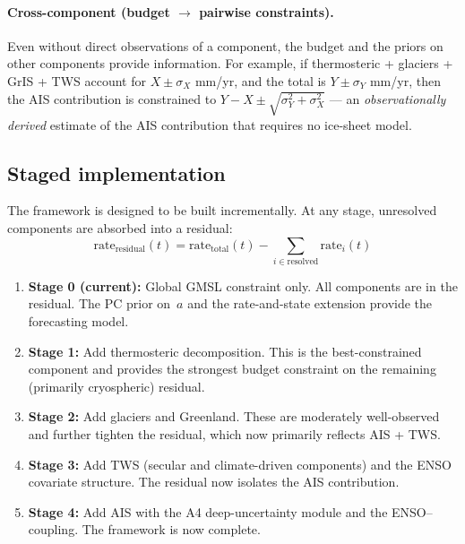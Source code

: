 \documentclass[11pt]{article}
\newcommand{\CDW}{\text{CDW}}
\begin{document}
\paragraph{Cross-component (budget $\to$ pairwise constraints).}  Even without direct observations of a component, the budget and the priors on other components provide information.  For example, if thermosteric + glaciers + GrIS + TWS account for $X \pm \sigma_X$ mm/yr, and the total is $Y \pm \sigma_Y$ mm/yr, then the AIS contribution is constrained to $Y - X \pm \sqrt{\sigma_Y^2 + \sigma_X^2}$ --- an \emph{observationally derived} estimate of the AIS contribution that requires no ice-sheet model.

\subsection{Staged implementation}

The framework is designed to be built incrementally.  At any stage, unresolved components are absorbed into a residual:
\begin{equation}
  \text{rate}_{\text{residual}}(t) = \text{rate}_{\text{total}}(t) - \sum_{i \in \text{resolved}} \text{rate}_i(t)
\end{equation}

\begin{enumerate}
  \item \textbf{Stage 0 (current):} Global GMSL constraint only.  All components are in the residual.  The PC prior on~$a$ and the rate-and-state extension provide the forecasting model.

  \item \textbf{Stage 1:} Add thermosteric decomposition.  This is the best-constrained component and provides the strongest budget constraint on the remaining (primarily cryospheric) residual.

  \item \textbf{Stage 2:} Add glaciers and Greenland.  These are moderately well-observed and further tighten the residual, which now primarily reflects AIS + TWS.

  \item \textbf{Stage 3:} Add TWS (secular and climate-driven components) and the ENSO covariate structure.  The residual now isolates the AIS contribution.

  \item \textbf{Stage 4:} Add AIS with the A4 deep-uncertainty module and the ENSO--\CDW{} coupling.  The framework is now complete.
\end{enumerate}
\end{document}
